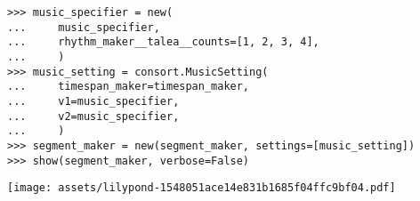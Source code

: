 \begin{comment}
<abjad>[stylesheet=../consort.ily]
music_specifier = new(
    music_specifier,
    rhythm_maker__talea__counts=[1, 2, 3, 4],
    )
music_setting = consort.MusicSetting(
    timespan_maker=timespan_maker,
    v1=music_specifier,
    v2=music_specifier,
    )
segment_maker = new(segment_maker, settings=[music_setting])
show(segment_maker, verbose=False)
</abjad>
\end{comment}

\begin{singlespacing}
\vspace{-0.5\baselineskip}
\begin{lstlisting}
>>> music_specifier = new(
...     music_specifier,
...     rhythm_maker__talea__counts=[1, 2, 3, 4],
...     )
>>> music_setting = consort.MusicSetting(
...     timespan_maker=timespan_maker,
...     v1=music_specifier,
...     v2=music_specifier,
...     )
>>> segment_maker = new(segment_maker, settings=[music_setting])
>>> show(segment_maker, verbose=False)
\end{lstlisting}
\noindent\texttt{[image: assets/lilypond-1548051ace14e831b1685f04ffc9bf04.pdf]}
\end{singlespacing}

\begin{comment}
<abjad>[stylesheet=../consort.ily]
other_music_specifier = consort.MusicSpecifier(
    pitch_handler=consort.AbsolutePitchHandler(pitch_specifier='g fs e f'),
    rhythm_maker=rhythmmakertools.EvenDivisionRhythmMaker(
        denominators=[8],
        extra_counts_per_division=(1,),
        ),
    )
other_music_setting = consort.MusicSetting(
    timespan_maker=consort.TaleaTimespanMaker(
        initial_silence_talea=rhythmmakertools.Talea([1], 2),
        silence_talea=rhythmmakertools.Talea([1], 2),
        ),
    v1=other_music_specifier,
    v2=other_music_specifier,
    )
segment_maker = new(
    segment_maker,
    settings=[music_setting, other_music_setting],
    )
show(segment_maker, verbose=False)
</abjad>
\end{comment}

